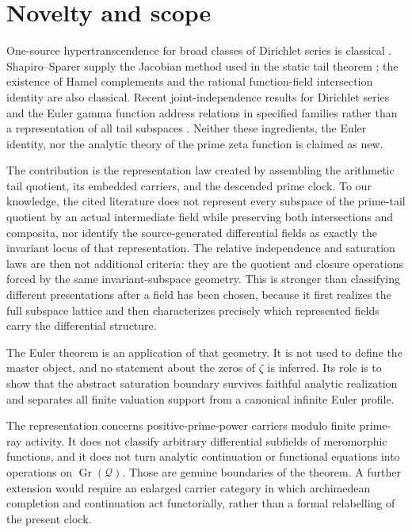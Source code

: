 \documentclass[11pt]{article}
\theoremstyle{definition}
\theoremstyle{remark}
\newcommand{\cQ}{\mathcal Q}
\begin{document}
\section{Novelty and scope}\label{sec:scope}

One-source hypertranscendence for broad classes of Dirichlet series is classical
\cite{Ostrowski,AmouKatsurada,Pong,Nagoshi}.  Shapiro--Sparer supply the Jacobian method used in
the static tail theorem \cite{ShapiroSparer}; the existence of Hamel complements and the rational
function-field intersection identity are also classical.  Recent joint-independence results for
Dirichlet series and the Euler gamma function address relations in specified families rather
than a representation of all tail subspaces \cite{LuJiangLu}.  Neither these ingredients, the
Euler identity, nor the analytic theory of the prime zeta function \cite{Froberg} is claimed as
new.

The contribution is the representation law created by assembling the arithmetic tail quotient,
its embedded carriers, and the descended prime clock.  To our knowledge, the cited literature
does not represent every subspace of the prime-tail quotient by an actual intermediate field
while preserving both intersections and composita, nor identify the source-generated
differential fields as exactly the invariant locus of that representation.  The relative
independence and saturation laws are then not additional criteria: they are the quotient and
closure operations forced by the same invariant-subspace geometry.  This is stronger than
classifying different presentations after a field has been chosen, because it first realizes the
full subspace lattice and then characterizes precisely which represented fields carry the
differential structure.

The Euler theorem is an application of that geometry.  It is not used to define the master
object, and no statement about the zeros of \(\zeta\) is inferred.  Its role is to show that the
abstract saturation boundary survives faithful analytic realization and separates all finite
valuation support from a canonical infinite Euler profile.

The representation concerns positive-prime-power carriers modulo finite prime-ray activity.  It
does not classify arbitrary differential subfields of meromorphic functions, and it does not
turn analytic continuation or functional equations into operations on \(\operatorname{Gr}(\cQ)\).
Those are genuine boundaries of the theorem.  A further extension would require an enlarged
carrier category in which archimedean completion and continuation act functorially, rather than a
formal relabelling of the present clock.
\end{document}
